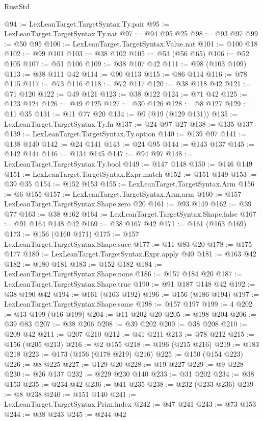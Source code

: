 \begin{lexlean}{RustStd}
\begin{coremodule}
{\begin{coremodule}
{{{{{{{{{{{{{{@94 := LexLeanTarget.TargetSyntax.Ty.pair
@95 := LexLeanTarget.TargetSyntax.Ty.nat
@97 := @94 @95 @25
@98 := @93 @97
@99 := @50 @95
@100 := LexLeanTarget.TargetSyntax.Value.nat
@101 := @100 @18
@102 := @99 @101
@103 := @38 @102
@105 := @53 (@56 @65)
@106 := @52 @105
@107 := @51 @106
@109 := @38 @107 @42
@111 := @98 (@103 @109)
@113 := @38 @111 @42
@114 := @90 @113
@115 := @86 @114
@116 := @78 @115
@117 := @73 @116
@118 := @72 @117
@120 := @38 @118 @42
@121 := @71 @120
@122 := @49 @121
@123 := @38 @122
@124 := @71 @42
@125 := @123 @124
@126 := @49 @125
@127 := @30 @126
@128 := @8 @127
@129 := @11 @35
@131 := @11 @77 @20
@134 := @9 (@19 (@129 @131))
@135 := LexLeanTarget.TargetSyntax.Ty.fn
@137 := @24 @97 @27
@138 := @135 @137
@139 := LexLeanTarget.TargetSyntax.Ty.option
@140 := @139 @97
@141 := @138 @140
@142 := @24 @141
@143 := @24 @95
@144 := @143 @137
@145 := @142 @144
@146 := @134 @145
@147 := @94 @97
@148 := LexLeanTarget.TargetSyntax.Ty.bool
@149 := @147 @148
@150 := @146 @149
@151 := LexLeanTarget.TargetSyntax.Expr.match
@152 := @151 @149
@153 := @39 @35
@154 := @152 @153
@155 := LexLeanTarget.TargetSyntax.Arm
@156 := @6 @155
@157 := LexLeanTarget.TargetSyntax.Arm.arm
@160 := @157 LexLeanTarget.TargetSyntax.Shape.zero @20
@161 := @93 @149
@162 := @39 @77
@163 := @38 @162
@164 := LexLeanTarget.TargetSyntax.Shape.false
@167 := @91 @164 @148 @42
@169 := @38 @167 @42
@171 := @161 (@163 @169)
@173 := @156 (@160 @171)
@175 := @157 LexLeanTarget.TargetSyntax.Shape.succ
@177 := @11 @83 @20
@178 := @175 @177
@180 := LexLeanTarget.TargetSyntax.Expr.apply @40
@181 := @163 @42
@182 := @180 @181
@183 := @152 @182
@184 := LexLeanTarget.TargetSyntax.Shape.none
@186 := @157 @184 @20
@187 := LexLeanTarget.TargetSyntax.Shape.true
@190 := @91 @187 @148 @42
@192 := @38 @190 @42
@194 := @161 (@163 @192)
@196 := @156 (@186 @194)
@197 := LexLeanTarget.TargetSyntax.Shape.some
@198 := @157 @197
@199 := 4
@202 := @13 @199 (@16 @199)
@204 := @11 @202 @20
@205 := @198 @204
@206 := @39 @83
@207 := @38 @206
@208 := @39 @202
@209 := @38 @208
@210 := @209 @42
@211 := @207 @210
@212 := @41 @211
@213 := @78 @212
@215 := @156 (@205 @213)
@216 := @2 @155
@218 := @196 (@215 @216)
@219 := @183 @218
@223 := @173 (@156 (@178 @219) @216)
@225 := @150 (@154 @223)
@226 := @8 @225
@227 := @129 @20
@228 := @19 @227
@229 := @9 @228
@230 := @26 @137
@232 := @229 @230 @140
@233 := @31 @202
@234 := @38 @153
@235 := @234 @42
@236 := @41 @235
@238 := @232 (@233 @236)
@239 := @8 @238
@240 := @151 @140
@241 := LexLeanTarget.TargetSyntax.Prim.index
@242 := @47 @241
@243 := @73 @153
@244 := @38 @243
@245 := @244 @42
}}}}}}}}}}}}}}
\end{coremodule}}
\end{coremodule}
\end{lexlean}
